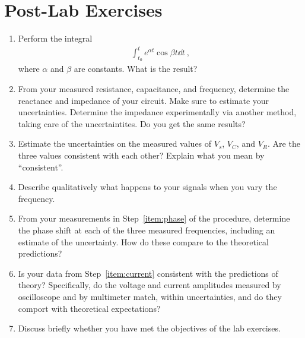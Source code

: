 \documentclass[12pt]{article}
\begin{document}
\newpage

\section*{Post-Lab Exercises}

\begin{enumerate}
\item Perform the integral 
  \begin{gather*}
    \int_{t_0}^t e^{\alpha t} \cos\beta t \dd t\ ,
  \end{gather*}
  where $\alpha$ and $\beta$ are constants.  What is the result?
\item From your measured resistance, capacitance, and frequency,
  determine the reactance and impedance of your circuit.  Make sure to
  estimate your uncertainties.  Determine the impedance experimentally
  via another method, taking care of the uncertaintites.%
  Do you get the same results?
\item Estimate the uncertainties on the measured values of $V_s$,
  $V_C$, and $V_R$.  Are the three values consistent with each other?
  Explain what you mean by ``consistent''.
\item Describe qualitatively what happens to your signals when you
  vary the frequency.
\item From your measurements in Step~\ref{item:phase} of the
  procedure, determine the phase shift at each of the three measured
  frequencies, including an estimate of the uncertainty.  How do these
  compare to the theoretical predictions? 
\item Is your data from Step~\ref{item:current} consistent with the
  predictions of theory?  Specifically, do the voltage and current
  amplitudes measured by oscilloscope and by multimeter match, within
  uncertainties, and do they comport with theoretical expectations?
\item Discuss briefly whether you have met the objectives of the lab
  exercises.
\end{enumerate}
\end{document}
